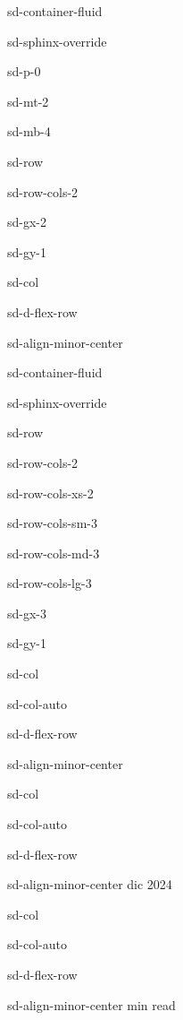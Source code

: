 \documentclass[letterpaper,10pt,italian]{jupyterBook}
\begin{document}
\begin{sphinxuseclass}{sd-container-fluid}
\begin{sphinxuseclass}{sd-sphinx-override}
\begin{sphinxuseclass}{sd-p-0}
\begin{sphinxuseclass}{sd-mt-2}
\begin{sphinxuseclass}{sd-mb-4}
\begin{sphinxuseclass}{sd-row}
\begin{sphinxuseclass}{sd-row-cols-2}
\begin{sphinxuseclass}{sd-gx-2}
\begin{sphinxuseclass}{sd-gy-1}
\begin{sphinxuseclass}{sd-col}
\begin{sphinxuseclass}{sd-d-flex-row}
\begin{sphinxuseclass}{sd-align-minor-center}
\begin{sphinxuseclass}{sd-container-fluid}
\begin{sphinxuseclass}{sd-sphinx-override}
\begin{sphinxuseclass}{sd-row}
\begin{sphinxuseclass}{sd-row-cols-2}
\begin{sphinxuseclass}{sd-row-cols-xs-2}
\begin{sphinxuseclass}{sd-row-cols-sm-3}
\begin{sphinxuseclass}{sd-row-cols-md-3}
\begin{sphinxuseclass}{sd-row-cols-lg-3}
\begin{sphinxuseclass}{sd-gx-3}
\begin{sphinxuseclass}{sd-gy-1}
\begin{sphinxuseclass}{sd-col}
\begin{sphinxuseclass}{sd-col-auto}
\begin{sphinxuseclass}{sd-d-flex-row}
\begin{sphinxuseclass}{sd-align-minor-center}
\end{sphinxuseclass}
\end{sphinxuseclass}
\end{sphinxuseclass}
\end{sphinxuseclass}
\begin{sphinxuseclass}{sd-col}
\begin{sphinxuseclass}{sd-col-auto}
\begin{sphinxuseclass}{sd-d-flex-row}
\begin{sphinxuseclass}{sd-align-minor-center}
 dic 2024

\end{sphinxuseclass}
\end{sphinxuseclass}
\end{sphinxuseclass}
\end{sphinxuseclass}
\begin{sphinxuseclass}{sd-col}
\begin{sphinxuseclass}{sd-col-auto}
\begin{sphinxuseclass}{sd-d-flex-row}
\begin{sphinxuseclass}{sd-align-minor-center}
 min read


\end{sphinxuseclass}
\end{sphinxuseclass}
\end{sphinxuseclass}
\end{sphinxuseclass}
\end{sphinxuseclass}
\end{sphinxuseclass}
\end{sphinxuseclass}
\end{sphinxuseclass}
\end{sphinxuseclass}
\end{sphinxuseclass}
\end{sphinxuseclass}
\end{sphinxuseclass}
\end{sphinxuseclass}
\end{sphinxuseclass}
\end{sphinxuseclass}
\end{sphinxuseclass}
\end{sphinxuseclass}
\end{sphinxuseclass}
\end{sphinxuseclass}
\end{sphinxuseclass}
\end{sphinxuseclass}
\end{sphinxuseclass}
\end{sphinxuseclass}
\end{sphinxuseclass}
\end{sphinxuseclass}
\end{sphinxuseclass}
\end{document}
